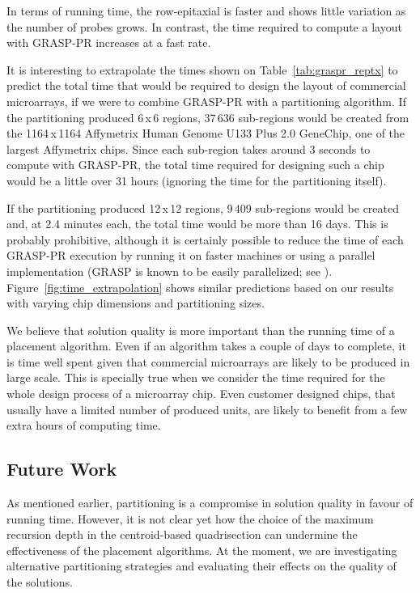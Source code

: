 \documentclass{bioinfo}
\begin{document}
In terms of running time, the row-epitaxial is faster and shows little variation as the number of probes grows. In contrast, the time required to compute a layout with GRASP-PR increases at a fast rate.

It is interesting to extrapolate the times shown on Table~\ref{tab:graspr_reptx} to predict the total time that would be required to design the layout of commercial microarrays, if we were to combine GRASP-PR with a partitioning algorithm. If the partitioning produced 6\,x\,6 regions, 37\,636 sub-regions would be created from the 1164\,x\,1164 Affymetrix Human Genome U133 Plus 2.0 GeneChip\raisebox{.6ex}{\scriptsize \textregistered}, one of the largest Affymetrix chips. Since each sub-region takes around 3 seconds to compute with GRASP-PR, the total time required for designing such a chip would be a little over 31 hours (ignoring the time for the partitioning itself).

If the partitioning produced 12\,x\,12 regions, 9\,409 sub-regions would be created and, at 2.4 minutes each, the total time would be more than 16 days. This is probably prohibitive, although it is certainly possible to reduce the time of each GRASP-PR execution by running it on faster machines or using a parallel implementation (GRASP is known to be easily parallelized; see \citealp{LI94}). Figure~\ref{fig:time_extrapolation} shows similar predictions based on our results with varying chip dimensions and partitioning sizes.

We believe that solution quality is more important than the running time of a placement algorithm. Even if an algorithm takes a couple of days to complete, it is time well spent given that commercial microarrays are likely to be produced in large scale. This is specially true when we consider the time required for the whole design process of a microarray chip. Even customer designed chips, that usually have a limited number of produced units, are likely to benefit from a few extra hours of computing time.

\subsection{Future Work}

As mentioned earlier, partitioning is a compromise in solution quality in favour of running time. However, it is not clear yet how the choice of the maximum recursion depth in the centroid-based quadrisection can undermine the effectiveness of the placement algorithms. At the moment, we are investigating alternative partitioning strategies and evaluating their effects on the quality of the solutions.
\end{document}
